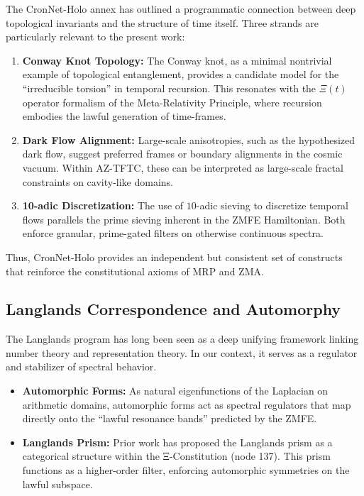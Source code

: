 \documentclass[12]{amsart}
\theoremstyle{plain}
\begin{document}
The CronNet-Holo annex \cite{CronNetAnnex} has outlined a programmatic connection between deep topological invariants and the structure of time itself. 
Three strands are particularly relevant to the present work: 

\begin{enumerate}
    \item \textbf{Conway Knot Topology:} The Conway knot, as a minimal nontrivial example of topological entanglement, provides a candidate model for the ``irreducible torsion'' in temporal recursion. This resonates with the $\Xi(t)$ operator formalism of the Meta-Relativity Principle, where recursion embodies the lawful generation of time-frames. 
    \item \textbf{Dark Flow Alignment:} Large-scale anisotropies, such as the hypothesized dark flow, suggest preferred frames or boundary alignments in the cosmic vacuum. Within AZ-TFTC, these can be interpreted as large-scale fractal constraints on cavity-like domains. 
    \item \textbf{10-adic Discretization:} The use of $10$-adic sieving to discretize temporal flows parallels the prime sieving inherent in the ZMFE Hamiltonian. Both enforce granular, prime-gated filters on otherwise continuous spectra.
\end{enumerate}

Thus, CronNet-Holo provides an independent but consistent set of constructs that reinforce the constitutional axioms of MRP and ZMA. 

\subsection{Langlands Correspondence and Automorphy}

The Langlands program has long been seen as a deep unifying framework linking number theory and representation theory. 
In our context, it serves as a regulator and stabilizer of spectral behavior. 

\begin{itemize}
    \item \textbf{Automorphic Forms:} As natural eigenfunctions of the Laplacian on arithmetic domains, automorphic forms act as spectral regulators that map directly onto the ``lawful resonance bands'' predicted by the ZMFE. 
    \item \textbf{Langlands Prism:} Prior work has proposed the Langlands prism as a categorical structure within the Ξ-Constitution (node 137). This prism functions as a higher-order filter, enforcing automorphic symmetries on the lawful subspace. 
\end{itemize}
\end{document}
